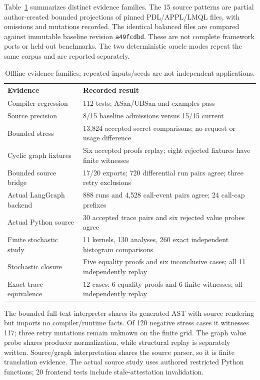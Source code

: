 \documentclass[preprint,12pt, a4paper]{elsarticle}
\begin{document}
Table~\ref{tab:evidence} summarizes distinct evidence families. The 15 source patterns are partial author-created bounded projections of pinned PDL/APPL/LMQL files, with omissions and mutations recorded. The identical balanced files are compared against immutable baseline revision \texttt{a49fcdbd}. These are not complete framework ports or held-out benchmarks. The two deterministic oracle modes repeat the same corpus and are reported separately.

\begin{table}[ht]
\centering
\begin{tabular}{lp{8cm}}
\hline
Evidence & Recorded result \\
\hline
Compiler regression & 112 tests; ASan/UBSan and examples pass \\
Source precision & 8/15 baseline admissions versus 15/15 current \\
Bounded stress & 13,824 accepted secret comparisons; no request or usage difference \\
Cyclic graph fixtures & Six accepted proofs replay; eight rejected fixtures have finite witnesses \\
Bounded source bridge & 17/20 exports; 720 differential run pairs agree; three retry exclusions \\
Actual LangGraph backend & 888 runs and 4,528 call-event pairs agree; 24 call-cap prefixes \\
Actual Python source & 30 accepted trace pairs and six rejected value probes agree \\
Finite stochastic study & 11 kernels, 130 analyses, 260 exact independent histogram comparisons \\
Stochastic closure & Five equality proofs and six inconclusive cases; all 11 independently replay \\
Exact trace equivalence & 12 cases: 6 equality proofs and 6 finite witnesses; all independently replay \\
\hline
\end{tabular}
\caption{Offline evidence families; repeated inputs/seeds are not independent applications.}
\label{tab:evidence}
\end{table}

The bounded full-text interpreter shares its generated AST with source rendering but imports no compiler/runtime facts. Of 120 negative stress cases it witnesses 117; three retry mutations remain unknown on the finite grid. The graph value probe shares producer normalization, while structural replay is separately written. Source/graph interpretation shares the source parser, so it is finite translation evidence. The actual source study uses authored restricted Python functions; 20 frontend tests include stale-attestation invalidation.
\end{document}
